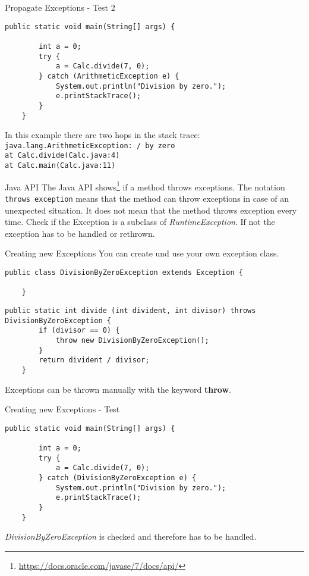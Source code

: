 \begin{frame}[fragile]{Propagate Exceptions - Test 2}
	\begin{lstlisting}[basicstyle=\ttfamily\scriptsize, firstnumber=7]
	public static void main(String[] args) {
	
	    int a = 0;
	    try {
	        a = Calc.divide(7, 0);
	    } catch (ArithmeticException e) {
	        System.out.println("Division by zero.");
	        e.printStackTrace();
	    }
	}
	\end{lstlisting}
	In this example there are two hops in the stack trace:\\
	\texttt{java.lang.ArithmeticException: / by zero}\\
	\texttt{at Calc.divide(Calc.java:4)}\\
	\texttt{at Calc.main(Calc.java:11)}
\end{frame}

\begin{frame}{Java API}
	The Java API shows\footnote{\scriptsize\url{https://docs.oracle.com/javase/7/docs/api/}}
	if a method throws exceptions. 
	The notation \texttt{throws exception} means that the method can throw 
	exceptions in case of an unexpected situation.
	It does not mean that the method throws exception every time.
	\vfill
	Check if the Exception is a subclass of \emph{RuntimeException}. 
	If not the exception has to be handled or rethrown.
\end{frame}

\begin{frame}[fragile]{Creating new Exceptions}
	You can create und use your own exception class.
	\begin{lstlisting}[basicstyle=\ttfamily\scriptsize]
	public class DivisionByZeroException extends Exception {

	}
	\end{lstlisting}
	\vfill
	\begin{lstlisting}[basicstyle=\ttfamily\scriptsize]
	public static int divide (int divident, int divisor) throws DivisionByZeroException {
	    if (divisor == 0) {
	        throw new DivisionByZeroException();
	    }
	    return divident / divisor;
	}
	\end{lstlisting}	
	Exceptions can be thrown manually with the keyword \textbf{throw}.
\end{frame}

\begin{frame}[fragile]{Creating new Exceptions - Test}
	\begin{lstlisting}[basicstyle=\ttfamily\scriptsize]
	public static void main(String[] args) {
	
	    int a = 0;
	    try {
	        a = Calc.divide(7, 0);
	    } catch (DivisionByZeroException e) {
	        System.out.println("Division by zero.");
	        e.printStackTrace();
	    }
	}
	\end{lstlisting}	
	\emph{DivisionByZeroException} is checked and therefore has to be handled.
\end{frame}

